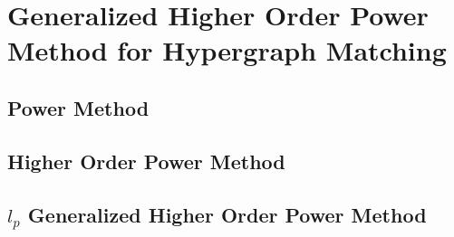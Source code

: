 \chapter{Generalized Higher Order Power Method for Hypergraph Matching}
\section{Power Method}
\section{Higher Order Power Method}
\section{$l_p$ Generalized Higher Order Power Method}
